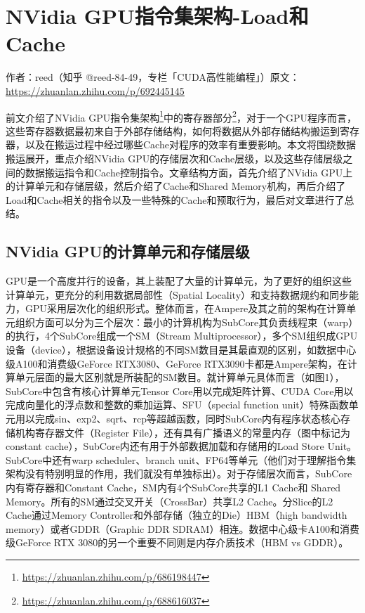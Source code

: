 \chapter{NVidia GPU指令集架构-Load和Cache}

\begin{center}\small 作者：reed（知乎 @reed-84-49，专栏「CUDA高性能编程」）\quad 原文：\url{https://zhuanlan.zhihu.com/p/692445145}\end{center}

前文介绍了NVidia GPU指令集架构\footnote{\url{https://zhuanlan.zhihu.com/p/686198447}}中的寄存器部分\footnote{\url{https://zhuanlan.zhihu.com/p/688616037}}，对于一个GPU程序而言，这些寄存器数据最初来自于外部存储结构，如何将数据从外部存储结构搬运到寄存器，以及在搬运过程中经过哪些Cache对程序的效率有重要影响。本文将围绕数据搬运展开，重点介绍NVidia GPU的存储层次和Cache层级，以及这些存储层级之间的数据搬运指令和Cache控制指令。文章结构方面，首先介绍了NVidia GPU上的计算单元和存储层级，然后介绍了Cache和Shared Memory机构，再后介绍了Load和Cache相关的指令以及一些特殊的Cache和预取行为，最后对文章进行了总结。

\section{NVidia GPU的计算单元和存储层级}

GPU是一个高度并行的设备，其上装配了大量的计算单元，为了更好的组织这些计算单元，更充分的利用数据局部性（Spatial Locality）和支持数据规约和同步能力，GPU采用层次化的组织形式。整体而言，在Ampere及其之前的架构在计算单元组织方面可以分为三个层次：最小的计算机构为SubCore其负责线程束（warp）的执行，4个SubCore组成一个SM（Stream Multiprocessor），多个SM组织成GPU设备（device），根据设备设计规格的不同SM数目是其最直观的区别，如数据中心级A100和消费级GeForce RTX3080、GeForce RTX3090卡都是Ampere架构，在计算单元层面的最大区别就是所装配的SM数目。就计算单元具体而言（如图1），SubCore中包含有核心计算单元Tensor Core用以完成矩阵计算、CUDA Core用以完成向量化的浮点数和整数的乘加运算、SFU（special function unit）特殊函数单元用以完成sin、exp2、sqrt、rcp等超越函数，同时SubCore内有程序状态核心存储机构寄存器文件（Register File），还有具有广播语义的常量内存（图中标记为constant cache），SubCore内还有用于外部数据加载和存储用的Load Store Unit。SubCore中还有warp scheduler、branch unit、FP64等单元（他们对于理解指令集架构没有特别明显的作用，我们就没有单独标出）。对于存储层次而言，SubCore内有寄存器和Constant Cache，SM内有4个SubCore共享的L1 Cache和 Shared Memory。所有的SM通过交叉开关（CrossBar）共享L2 Cache。分Slice的L2 Cache通过Memory Controller和外部存储（独立的Die）HBM（high bandwidth memory）或者GDDR（Graphic DDR SDRAM）相连。数据中心级卡A100和消费级GeForce RTX 3080的另一个重要不同则是内存介质技术（HBM vs GDDR）。

